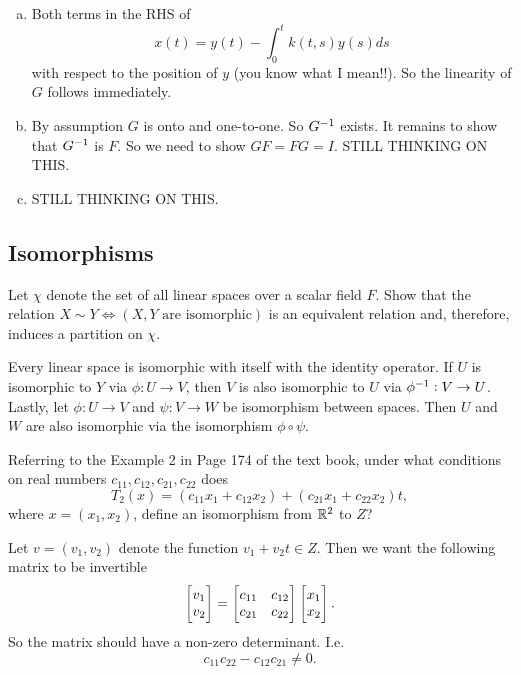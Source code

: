 \begin{solution}
	\begin{enumerate}[(a)]
		\item Both terms in the RHS of 
		\[ x(t) = y(t) - \int_{0}^{t}k(t,s)y(s)ds \]
		with respect to the position  of $ y $ (you know what I mean!!). So the linearity of $ G $ follows immediately.
		
		\item By assumption $ G $ is onto and one-to-one. So $ G^{-1} $ exists. It remains to show that $ G^{-1} $ is $ F $. So we need to show $ GF = FG = I $. STILL THINKING ON THIS.
		
		\item STILL THINKING ON THIS.
	\end{enumerate}
\end{solution}


\subsection{Isomorphisms}
\begin{problem}
	Let $ \chi $ denote the set of all linear spaces over a scalar field $ F $. Show that the relation $ X\sim Y  \Leftrightarrow (\text{$X,Y$ are isomorphic})$ is an equivalent relation and, therefore, induces a partition on $ \chi $.
\end{problem}

\begin{solution}
	Every linear space is isomorphic with itself with the identity operator. If $ U $ is isomorphic to $ Y $ via $ \phi:U\to V $, then $ V $ is also isomorphic to $ U $ via $ \phi^{-1}:V\to U $. Lastly, let $ \phi:U\to V $ and $ \psi: V\to W $ be isomorphism between spaces. Then $ U $ and $ W $ are also isomorphic via the isomorphism $ \phi\circ \psi $.  
\end{solution}

\begin{problem}
	Referring to the Example 2 in Page 174 of the text book, under what conditions on real numbers $ c_{11},c_{12},c_{21},c_{22} $ does
	\[ T_2(x) = (c_{11}x_1 + c_{12}x_2) + (c_{21}x_1 + c_{22}x_2)t,\]
	where $ x=(x_1,x_2) $, define an isomorphism from $ \mathbb{R}^2 $ to $ Z $?
\end{problem}

\begin{solution}
	Let $ v=(v_1,v_2) $ denote the function $ v_1+v_2t \in Z $. Then we want the following matrix to be invertible
	\[ \begin{bmatrix} v_1 \\ v_2 \end{bmatrix} = \begin{bmatrix} c_{11} & c_{12} \\ c_{21} & c_{22} \end{bmatrix}\begin{bmatrix} x_1 \\ x_2 \end{bmatrix}. \]
	So the matrix should have a non-zero determinant. I.e.
	\[ c_{11}c_{22} - c_{12}c_{21} \neq 0. \]
\end{solution}

